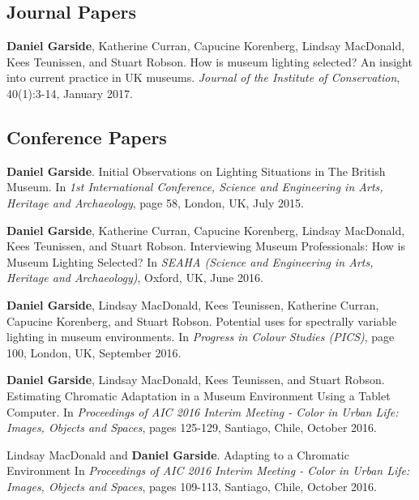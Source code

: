{\parindent0pt \footnotesize


\subsection*{Journal Papers}

\textbf{Daniel Garside}, Katherine Curran, Capucine Korenberg, Lindsay MacDonald, Kees Teunissen, and Stuart Robson. How is museum lighting selected? An insight into current practice in UK museums. \textit{Journal of the Institute of Conservation}, 40(1):3-14, January 2017. 

\subsection*{Conference Papers}

\textbf{Daniel Garside}. Initial Observations on Lighting Situations in The British Museum. In \textit{1st International Conference, Science and Engineering in Arts, Heritage and Archaeology}, page 58, London, UK, July 2015. 
\bigskip

\textbf{Daniel Garside}, Katherine Curran, Capucine Korenberg, Lindsay MacDonald, Kees Teunissen, and Stuart Robson. Interviewing Museum Professionals: How is Museum Lighting Selected? In \textit{SEAHA (Science and Engineering in Arts, Heritage and Archaeology)}, Oxford, UK, June 2016. 
\bigskip

\textbf{Daniel Garside}, Lindsay MacDonald, Kees Teunissen, Katherine Curran, Capucine Korenberg, and Stuart Robson. Potential uses for spectrally variable lighting in museum environments. In \textit{Progress in Colour Studies (PICS)}, page 100, London, UK, September 2016. 
\smallskip %

\textbf{Daniel Garside}, Lindsay MacDonald, Kees Teunissen, and Stuart Robson. Estimating Chromatic Adaptation in a Museum Environment Using a Tablet Computer. In
\textit{Proceedings of AIC 2016 Interim Meeting - Color in Urban Life: Images, Objects and Spaces}, pages 125-129, Santiago, Chile, October 2016. 
\bigskip

Lindsay MacDonald and \textbf{Daniel Garside}. Adapting to a Chromatic Environment In \textit{Proceedings of AIC 2016 Interim Meeting - Color in Urban Life: Images, Objects and Spaces}, pages 109-113, Santiago, Chile, October 2016.
\bigskip

}
